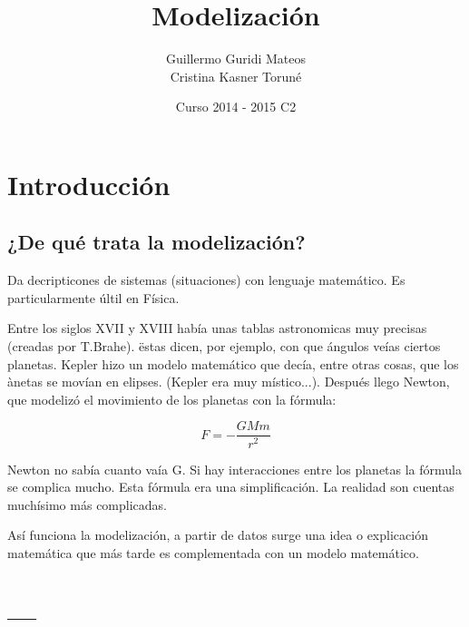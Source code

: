 \documentclass{apuntes}
\title{Modelización}
\author{Guillermo Guridi Mateos\\Cristina Kasner Toruné}
\date{Curso 2014 - 2015 C2}
\begin{document}
\pagestyle{plain}
\maketitle

\tableofcontents
\newpage

\chapter{Introducción}

\section{¿De qué trata la modelización?}

Da decripticones de sistemas (situaciones) con lenguaje matemático. Es particularmente últil en Física.

Entre los siglos XVII y XVIII había unas tablas astronomicas muy precisas (creadas por T.Brahe). ëstas dicen, por ejemplo, con que ángulos veías ciertos planetas.
Kepler hizo un modelo matemático que decía, entre otras cosas, que los ànetas se movían en elipses. (Kepler era muy místico...). Después llego Newton, que modelizó el movimiento de los planetas con la fórmula:

$$F = - \frac{GMm}{r^2}$$

Newton no sabía cuanto vaía G. Si hay interacciones entre los planetas la fórmula se complica mucho. Esta fórmula era una simplificación. La realidad son cuentas muchísimo más complicadas.

Así funciona la modelización, a partir de datos surge una idea o explicación matemática que más tarde es complementada con un modelo matemático.


\appendix

\chapter{---}

\printindex
\end{document}
